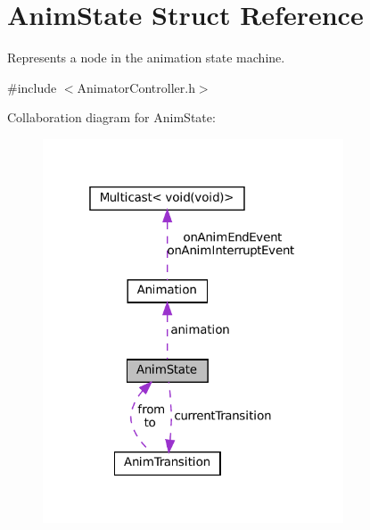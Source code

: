 \hypertarget{structAnimState}{}\section{Anim\+State Struct Reference}
\label{structAnimState}


Represents a node in the animation state machine.  




{\ttfamily \#include $<$Animator\+Controller.\+h$>$}



Collaboration diagram for Anim\+State\+:
\nopagebreak
\begin{figure}[H]
\begin{center}
\leavevmode
\includegraphics[width=253pt]{structAnimState__coll__graph}
\end{center}
\end{figure}
